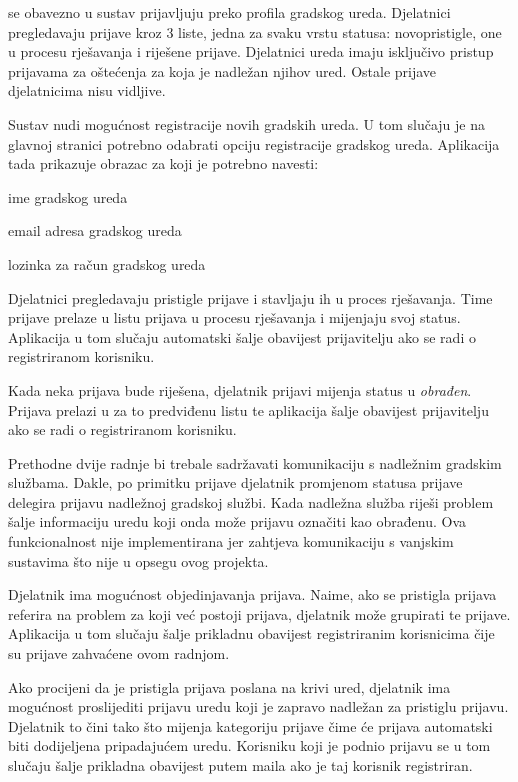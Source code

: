		 se obavezno u sustav prijavljuju preko profila gradskog ureda. Djelatnici pregledavaju prijave kroz 3 liste, jedna za svaku vrstu statusa: novopristigle, one u procesu rješavanja i riješene prijave. Djelatnici ureda imaju isključivo pristup prijavama za oštećenja za koja je nadležan njihov ured. Ostale prijave djelatnicima nisu vidljive.
		
		Sustav nudi mogućnost registracije novih gradskih ureda. U tom slučaju je na glavnoj stranici potrebno odabrati opciju registracije gradskog ureda. Aplikacija tada prikazuje obrazac za koji je potrebno navesti:
		\begin{packed_item} 
			\item ime gradskog ureda
			\item email adresa gradskog ureda
			\item lozinka za račun gradskog ureda
		\end{packed_item}
		
		Djelatnici pregledavaju pristigle prijave i stavljaju ih u proces rješavanja. Time prijave prelaze u listu prijava u procesu rješavanja i mijenjaju svoj status. Aplikacija u tom slučaju automatski šalje obavijest prijavitelju ako se radi o registriranom korisniku.
		
		Kada neka prijava bude riješena, djelatnik prijavi mijenja status u \textit{obrađen}. Prijava prelazi u za to predviđenu listu te aplikacija šalje obavijest prijavitelju ako se radi o registriranom korisniku.
		
		Prethodne dvije radnje bi trebale sadržavati komunikaciju s nadležnim gradskim službama. Dakle, po primitku prijave djelatnik promjenom statusa prijave delegira prijavu nadležnoj gradskoj službi. Kada nadležna služba riješi problem šalje informaciju uredu koji onda može prijavu označiti kao obrađenu. Ova funkcionalnost nije implementirana jer zahtjeva komunikaciju s vanjskim sustavima što nije u opsegu ovog projekta.
		
		Djelatnik ima mogućnost objedinjavanja prijava. Naime, ako se pristigla prijava referira na problem za koji već postoji prijava, djelatnik može grupirati te prijave. Aplikacija u tom slučaju šalje prikladnu obavijest registriranim korisnicima čije su prijave zahvaćene ovom radnjom.
		
		Ako procijeni da je pristigla prijava poslana na krivi ured, djelatnik ima mogućnost proslijediti prijavu uredu koji je zapravo nadležan za pristiglu prijavu. Djelatnik to čini tako što mijenja kategoriju prijave čime će prijava automatski biti dodijeljena pripadajućem uredu. Korisniku koji je podnio prijavu se u tom slučaju šalje prikladna obavijest putem maila ako je taj korisnik registriran.
		
